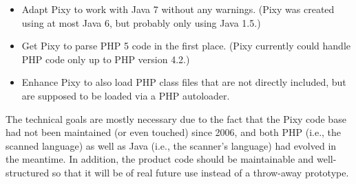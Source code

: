 \begin{itemize}
 \item Adapt Pixy to work with Java 7 without any warnings. (Pixy was created using at most Java 6, but probably only using Java 1.5.)
 \item Get Pixy to parse PHP 5 code in the first place. (Pixy currently could handle PHP code only up to PHP version 4.2.)
 \item Enhance Pixy to also load PHP class files that are not directly included, but are supposed to be loaded via a PHP autoloader.
\end{itemize}

The technical goals are mostly necessary due to the fact that the Pixy code base had not been maintained (or even touched) since 2006, and both PHP (i.e., the scanned language) as well as Java (i.e., the scanner's language) had evolved in the meantime. In addition, the product code should be maintainable and well-structured so that it will be of real future use instead of a throw-away prototype.
